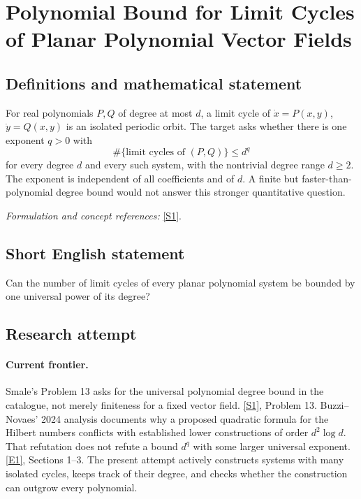 \documentclass[11pt,a4paper]{article}
\newcommand{\sref}[2]{\hyperlink{source:#1:#2}{[S#2]}}
\newcommand{\eref}[2]{\hyperlink{extra:#1:#2}{[E#2]}}
\newif\ifshowcatalogue
\newcommand{\cataloguescope}[1]{\ifshowcatalogue
 \paragraph{Exact scope in the supplied catalogue.}
 \begin{quote}\small #1\end{quote}\fi}
\numberwithin{equation}{section}
\begin{document}
\setcounter{section}{0}
\setlength{\parskip}{3pt plus 1pt}
\clearpage
\section*{\texorpdfstring{Polynomial Bound for Limit Cycles of Planar Polynomial Vector Fields}{Polynomial Bound for Limit Cycles of Planar Polynomial Vector Fields}}\label{30006740}
\subsection{Definitions and mathematical statement}
For real polynomials $P,Q$ of degree at most $d$, a limit cycle of $\dot x=P(x,y)$, $\dot y=Q(x,y)$ is an isolated periodic orbit. The target asks whether there is one exponent $q>0$ with
\[
 \#\{\text{limit cycles of }(P,Q)\}\le d^q
\]
for every degree $d$ and every such system, with the nontrivial degree range $d\ge2$. The exponent is independent of all coefficients and of $d$. A finite but faster-than-polynomial degree bound would not answer this stronger quantitative question.
\par\smallskip\textit{Formulation and concept references:} \sref{30006740}{1}.
\cataloguescope{Determine whether the number K of limit cycles of every planar polynomial differential system of degree at most d satisfies K \ensuremath{\le} d\textasciicircum{}q for some universal exponent q.}
\subsection{Short English statement}
Can the number of limit cycles of every planar polynomial system be bounded by one universal power of its degree?
\subsection{Research attempt}

\paragraph{Current frontier.}
Smale's Problem 13 asks for the universal polynomial degree bound in the
catalogue, not merely finiteness for a fixed vector field.
\sref{30006740}{1}, Problem 13.
Buzzi--Novaes' 2024 analysis documents why a proposed quadratic formula
for the Hilbert numbers conflicts with established lower constructions
of order $d^2\log d$.  That refutation does not refute a bound $d^q$
with some larger universal exponent. \eref{30006740}{1}, Sections 1--3.
The present attempt actively constructs systems with many isolated
cycles, keeps track of their degree, and checks whether the construction
can outgrow every polynomial.
\end{document}
